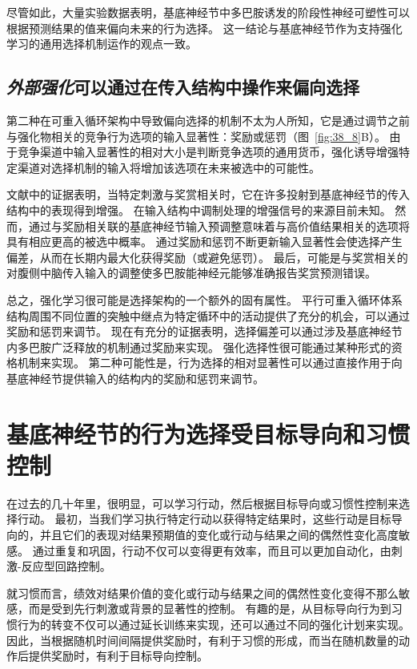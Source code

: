 尽管如此，大量实验数据表明，基底神经节中多巴胺诱发的阶段性神经可塑性可以根据预测结果的值来偏向未来的行为选择。
这一结论与基底神经节作为支持强化学习的通用选择机制运作的观点一致。



\subsection{\textit{外部强化}可以通过在传入结构中操作来偏向选择}

第二种在可重入循环架构中导致偏向选择的机制不太为人所知，它是通过调节之前与强化物相关的竞争行为选项的输入显著性：奖励或惩罚（图~\ref{fig:38_8}B）。
由于竞争渠道中输入显著性的相对大小是判断竞争选项的通用货币，强化诱导增强特定渠道对选择机制的输入将增加该选项在未来被选中的可能性。


文献中的证据表明，当特定刺激与奖赏相关时，它在许多投射到基底神经节的传入结构中的表现得到增强。
在输入结构中调制处理的增强信号的来源目前未知。
然而，通过与奖励相关联的基底神经节输入预调整意味着与高价值结果相关的选项将具有相应更高的被选中概率。
通过奖励和惩罚不断更新输入显著性会使选择产生偏差，从而在长期内最大化获得奖励（或避免惩罚）。
最后，可能是与奖赏相关的对腹侧中脑传入输入的调整使多巴胺能神经元能够准确报告奖赏预测错误。


总之，强化学习很可能是选择架构的一个额外的固有属性。
平行可重入循环体系结构周围不同位置的突触中继点为特定循环中的活动提供了充分的机会，可以通过奖励和惩罚来调节。
现在有充分的证据表明，选择偏差可以通过涉及基底神经节内多巴胺广泛释放的机制通过奖励来实现。
强化选择性很可能通过某种形式的资格机制来实现。
第二种可能性是，行为选择的相对显著性可以通过直接作用于向基底神经节提供输入的结构内的奖励和惩罚来调节。



\section{基底神经节的行为选择受目标导向和习惯控制}

在过去的几十年里，很明显，可以学习行动，然后根据目标导向或习惯性控制来选择行动。
最初，当我们学习执行特定行动以获得特定结果时，这些行动是目标导向的，并且它们的表现对结果预期值的变化或行动与结果之间的偶然性变化高度敏感。
通过重复和巩固，行动不仅可以变得更有效率，而且可以更加自动化，由刺激-反应型回路控制。


就习惯而言，绩效对结果价值的变化或行动与结果之间的偶然性变化变得不那么敏感，而是受到先行刺激或背景的显著性的控制。
有趣的是，从目标导向行为到习惯行为的转变不仅可以通过延长训练来实现，还可以通过不同的强化计划来实现。
因此，当根据随机时间间隔提供奖励时，有利于习惯的形成，而当在随机数量的动作后提供奖励时，有利于目标导向控制。


